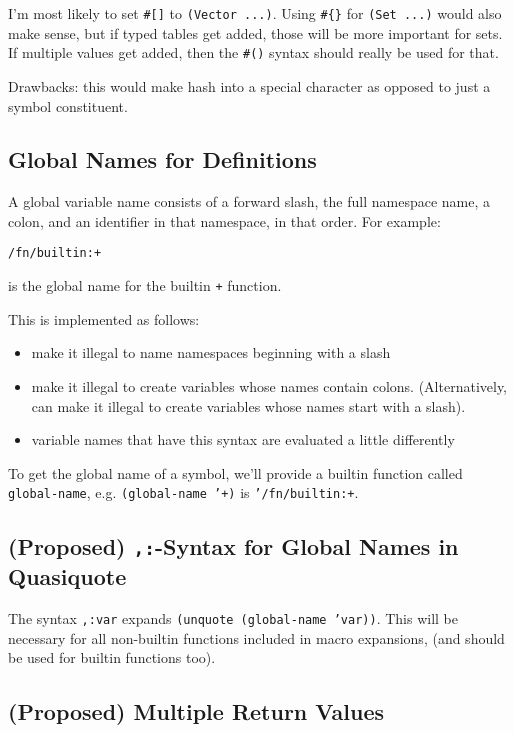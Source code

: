 \documentclass[11pt]{article}
\begin{document}
I'm most likely to set \texttt{\#[]} to \texttt{(Vector ...)}. Using \texttt{\#\{\}} for \texttt{(Set ...)} would also
make sense, but if typed tables get added, those will be more important for
sets. If multiple values get added, then the \texttt{\#()} syntax should really be used
for that.

Drawbacks: this would make hash into a special character as opposed to just a
symbol constituent.


\subsection{Global Names for Definitions}
\label{sec:org9fae995}

A global variable name consists of a forward slash, the full namespace name, a
colon, and an identifier in that namespace, in that order. For example:
\begin{verbatim}
/fn/builtin:+
\end{verbatim}
is the global name for the builtin \texttt{+} function.

This is implemented as follows:
\begin{itemize}
\item make it illegal to name namespaces beginning with a slash
\item make it illegal to create variables whose names contain colons.
(Alternatively, can make it illegal to create variables whose names start with
a slash).
\item variable names that have this syntax are evaluated a little differently
\end{itemize}

To get the global name of a symbol, we'll provide a builtin function called
\texttt{global-name}, e.g. \texttt{(global-name '+)} is \texttt{'/fn/builtin:+}.


\subsection{(Proposed) \texttt{,:}-Syntax for Global Names in Quasiquote}
\label{sec:orgc8beef5}

The syntax \texttt{,:var} expands \texttt{(unquote (global-name 'var))}. This will be necessary
for all non-builtin functions included in macro expansions, (and should be used
for builtin functions too).


\subsection{(Proposed) Multiple Return Values}
\label{sec:org223188a}
\end{document}

